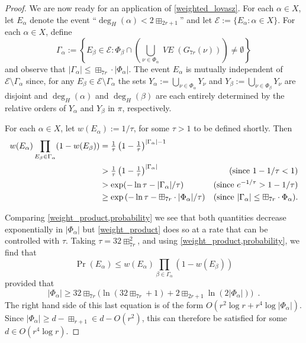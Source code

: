 \documentclass{patmorin}
\newcommand{\vol}[1]{\boxplus_{#1}}
\DeclareMathOperator{\VE}{\mathit{VE}}
\begin{document}
\begin{proof}
  We are now ready for an application of \cref{weighted_lovasz}.  For each $\alpha\in X$, let $E_\alpha$ denote the event ``$\deg_H(\alpha)< 2\vol{2r+1}$'' and let $\mathcal{E}:=\{E_\alpha:\alpha\in X\}$. For each $\alpha\in X$, define
  \[
     \Gamma_\alpha := \left\{E_\beta \in \mathcal{E}: \Phi_\beta\cap \left(\bigcup_{\nu\in \Phi_\alpha} \VE(G_{7r}(\nu))\right)\neq\emptyset\right\}
  \]
  and observe that $|\Gamma_\alpha|\le \vol{7r}\cdot|\Phi_\alpha|$.
  The event $E_\alpha$ is mutually independent of $\mathcal{E}\setminus\Gamma_\alpha$ since, for any $E_\beta\in\mathcal{E}\setminus\Gamma_\alpha$ the sets $Y_\alpha:=\bigcup_{\nu\in\Phi_\alpha} Y_\nu$ and $Y_\beta:=\bigcup_{\nu\in \Phi_\beta} Y_\nu$ are disjoint and $\deg_H(\alpha)$ and $\deg_H(\beta)$ are each entirely determined by the relative orders of $Y_\alpha$ and $Y_\beta$ in $\pi$, respectively.

  For each $\alpha\in X$, let $w(E_\alpha):=1/\tau$, for some $\tau>1$ to be defined shortly.  Then
  \begin{align}
    w(E_\alpha)\prod_{E_\beta\in\Gamma_\alpha} (1-w(E_\beta))
    & = \tfrac{1}{\tau}\left(1-\tfrac{1}{\tau}\right)^{|\Gamma_\alpha|-1} \notag \\
    & > \tfrac{1}{\tau}\left(1-\tfrac{1}{\tau}\right)^{|\Gamma_\alpha|}
      & \text{(since $1-1/\tau<1$)}\notag \\
    & > \exp(-\ln\tau-|\Gamma_\alpha|/\tau)
      & \text{(since $e^{-1/\tau}> 1-1/\tau$)}\notag \\
    & \ge \exp\left(-\ln\tau - \vol{7r}\cdot|\Phi_\alpha|/\tau\right)
      & \text{(since $|\Gamma_\alpha|\le \vol{7r}\cdot\Phi_\alpha$).}  \label{weight_product}
  \end{align}

  Comparing \cref{weight_product,probability} we see that both quantities decrease exponentially in $|\Phi_\alpha|$ but \cref{weight_product} does so at a rate that can be controlled with $\tau$.
  Taking $\tau = {32\vol{7r}^2}$, and using \cref{weight_product,probability}, we find that
  \[
     \Pr\left(E_\alpha\right) \le w(E_\alpha)\prod_{\beta\in\Gamma_\alpha}(1-w(E_\beta))
  \]
  provided that
  \[   |\Phi_\alpha| \ge {32\vol{7r}}\big(\ln({32\vol{7r}}+1) + {2\vol{2r+1}}\ln(2|\Phi_\alpha|)\big) \enspace .
  \]
  The right hand side of this last equation is of the form $O(r^2\log r+r^4\log|\Phi_\alpha|)$.  Since $|\Phi_\alpha|\ge d-\vol{r+1}\in d- O(r^2)$, this can therefore be satisfied for some $d\in O(r^4\log r)$.


\end{proof}
\end{document}
